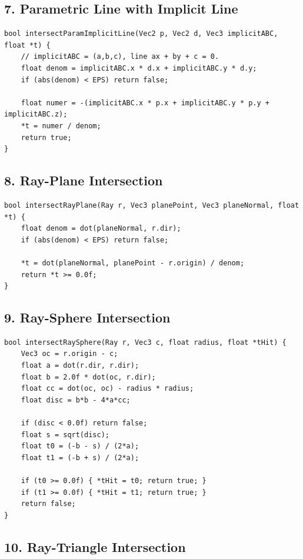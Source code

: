 \documentclass[10pt,letterpaper]{article}
\begin{document}
\subsection{7. Parametric Line with Implicit Line}

\begin{verbatim}
bool intersectParamImplicitLine(Vec2 p, Vec2 d, Vec3 implicitABC, float *t) {
    // implicitABC = (a,b,c), line ax + by + c = 0.
    float denom = implicitABC.x * d.x + implicitABC.y * d.y;
    if (abs(denom) < EPS) return false;

    float numer = -(implicitABC.x * p.x + implicitABC.y * p.y + implicitABC.z);
    *t = numer / denom;
    return true;
}
\end{verbatim}

\subsection{8. Ray-Plane Intersection}

\begin{verbatim}
bool intersectRayPlane(Ray r, Vec3 planePoint, Vec3 planeNormal, float *t) {
    float denom = dot(planeNormal, r.dir);
    if (abs(denom) < EPS) return false;

    *t = dot(planeNormal, planePoint - r.origin) / denom;
    return *t >= 0.0f;
}
\end{verbatim}

\subsection{9. Ray-Sphere Intersection}

\begin{verbatim}
bool intersectRaySphere(Ray r, Vec3 c, float radius, float *tHit) {
    Vec3 oc = r.origin - c;
    float a = dot(r.dir, r.dir);
    float b = 2.0f * dot(oc, r.dir);
    float cc = dot(oc, oc) - radius * radius;
    float disc = b*b - 4*a*cc;

    if (disc < 0.0f) return false;
    float s = sqrt(disc);
    float t0 = (-b - s) / (2*a);
    float t1 = (-b + s) / (2*a);

    if (t0 >= 0.0f) { *tHit = t0; return true; }
    if (t1 >= 0.0f) { *tHit = t1; return true; }
    return false;
}
\end{verbatim}

\subsection{10. Ray-Triangle Intersection}
\end{document}
